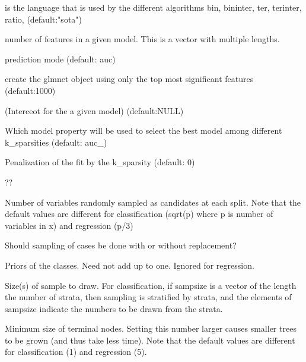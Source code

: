 \documentclass[a4paper]{book}
\begin{document}
%
\begin{Arguments}
\begin{ldescription}
\item[\code{language}] is the language that is used by the different algorithms bin, bininter, ter, terinter, ratio, (default:"sota")

\item[\code{sparsity:}] number of features in a given model. This is a vector with multiple lengths.

\item[\code{objective:}] prediction mode (default: auc)

\item[\code{max.nb.features:}] create the glmnet object using only the top most significant features (default:1000)

\item[\code{intercept:}] (Interceot for the a given model) (default:NULL)

\item[\code{evalToFit:}] Which model property will be used to select the best model among different k\_sparsities (default: auc\_)

\item[\code{k\_penalty:}] Penalization of the fit by the k\_sparsity (default: 0)

\item[\code{ntree:}] ??

\item[\code{mtry:}] Number of variables randomly sampled as candidates at each split. Note that the default values are different for classification (sqrt(p) where p is number of variables in x) and regression (p/3)

\item[\code{replace:}] Should sampling of cases be done with or without replacement?

\item[\code{classwt:}] Priors of the classes. Need not add up to one. Ignored for regression.

\item[\code{sampsize:}] Size(s) of sample to draw. For classification, if sampsize is a vector of the length the number of strata, then sampling is stratified by strata, and the elements of sampsize indicate the numbers to be drawn from the strata.

\item[\code{nodesize:}] Minimum size of terminal nodes. Setting this number larger causes smaller trees to be grown (and thus take less time). Note that the default values are different for classification (1) and regression (5).


\end{ldescription}
\end{Arguments}
\end{document}
